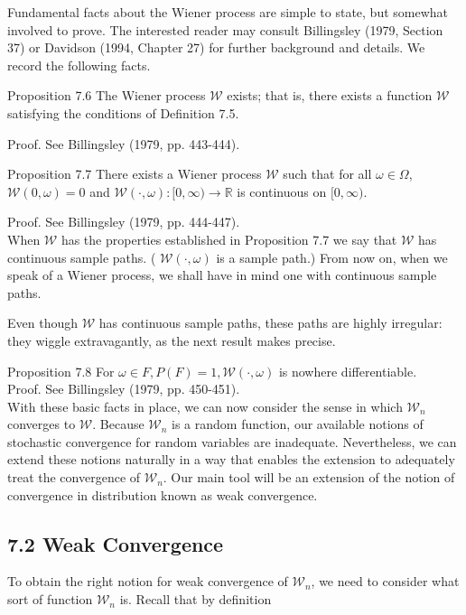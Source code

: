 \documentclass[10pt]{article}
\begin{document}
Fundamental facts about the Wiener process are simple to state, but somewhat involved to prove. The interested reader may consult Billingsley (1979, Section 37) or Davidson (1994, Chapter 27) for further background and details. We record the following facts.

Proposition 7.6 The Wiener process $\mathcal{W}$ exists; that is, there exists a function $\mathcal{W}$ satisfying the conditions of Definition 7.5.

Proof. See Billingsley (1979, pp. 443-444).

Proposition 7.7 There exists a Wiener process $\mathcal{W}$ such that for all $\omega \in \Omega$, $\mathcal{W}(0, \omega)=0$ and $\mathcal{W}(\cdot, \omega):[0, \infty) \rightarrow \mathbb{R}$ is continuous on $[0, \infty)$.

Proof. See Billingsley (1979, pp. 444-447).\\
When $\mathcal{W}$ has the properties established in Proposition 7.7 we say that $\mathcal{W}$ has continuous sample paths. ( $\mathcal{W}(\cdot, \omega)$ is a sample path.) From now on, when we speak of a Wiener process, we shall have in mind one with continuous sample paths.

Even though $\mathcal{W}$ has continuous sample paths, these paths are highly irregular: they wiggle extravagantly, as the next result makes precise.

Proposition 7.8 For $\omega \in F, P(F)=1, \mathcal{W}(\cdot, \omega)$ is nowhere differentiable.\\
Proof. See Billingsley (1979, pp. 450-451).\\
With these basic facts in place, we can now consider the sense in which $\mathcal{W}_{n}$ converges to $\mathcal{W}$. Because $\mathcal{W}_{n}$ is a random function, our available notions of stochastic convergence for random variables are inadequate. Nevertheless, we can extend these notions naturally in a way that enables the extension to adequately treat the convergence of $\mathcal{W}_{n}$. Our main tool will be an extension of the notion of convergence in distribution known as weak convergence.

\subsection*{7.2 Weak Convergence}
To obtain the right notion for weak convergence of $\mathcal{W}_{n}$, we need to consider what sort of function $\mathcal{W}_{n}$ is. Recall that by definition
\end{document}
